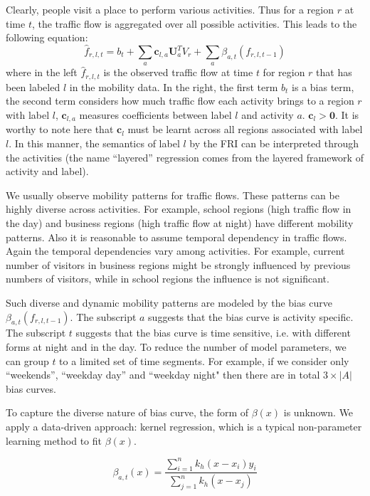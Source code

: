 \documentclass[runningheads]{llncs}
\begin{document}
Clearly, people visit a place to perform various activities.
Thus for a region $r$ at time $t$, the traffic flow is aggregated over all possible activities. This leads to the following equation:
\begin{equation}
\hat{f}_{r,l,t}=b_t+\sum_{a} \mathbf{c}_{l,a} \mathbf{U}_a^T V_r+ \sum_a \beta_{a,t} (f_{r,l,t-1})\label{equ:model}
\end{equation}
where in the left $\hat{f}_{r,l,t}$ is the observed traffic flow at time $t$ for region $r$ that has been labeled $l$ in the mobility data. In the right, the first term $b_t$ is a bias term, the second term considers how much traffic flow each activity brings to a region $r$ with label $l$, $\mathbf{c}_{l,a}$ measures coefficients between label $l$ and activity $a$. $\mathbf{c}_{l}>\mathbf{0}$. It is worthy to note here that $\mathbf{c}_l$ must be learnt across all regions associated with label $l$. In this manner, the semantics of label $l$ by the FRI can be interpreted through the activities (the name ``layered'' regression comes from the layered framework of activity and label).

We usually observe mobility patterns for traffic flows.
These patterns can be highly diverse across activities. 
For example, school regions (high traffic flow in the day) and business regions (high traffic flow at night) have different mobility patterns.
Also it is reasonable to assume temporal dependency in traffic flows.
Again the temporal dependencies vary among activities.
For example, current number of visitors in business regions might be strongly influenced by previous numbers of visitors, while in school regions the influence is not significant.  

Such diverse and dynamic mobility patterns are modeled by the bias curve $\beta_{a,t}(f_{r,l,t-1})$.
The subscript $a$ suggests that the bias curve is activity specific.
The subscript $t$ suggests that the bias curve is time sensitive, i.e. with different forms at night and in the day. To reduce the number of model parameters, we can group $t$ to a limited set of time segments. For example, if we consider only ``weekends'', ``weekday day''  and ``weekday night" then there are in total $3\times |A|$ bias curves. 

To capture the diverse nature of bias curve, the form of $\beta(x)$ is unknown.
We apply a data-driven approach: kernel regression, which is a typical non-parameter learning method to fit $\beta(x)$.

\begin{equation}\label{eqn:kernel}
\beta_{a,t} (x) = \frac{\sum_{i=1}^n k_h(x-x_i) y_i}{ \sum_{j=1}^n k_h(x-x_j)}
\end{equation}
\end{document}

